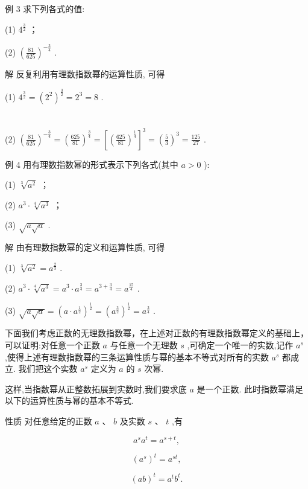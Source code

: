 \documentclass[10pt]{article}
\begin{document}
例 3 求下列各式的值:

(1) \({4}^{\frac{3}{2}}\) ；

(2) \({\left( \frac{81}{625}\right) }^{-\frac{3}{4}}\) .

解 反复利用有理数指数幂的运算性质, 可得

(1) \({4}^{\frac{3}{2}} = {\left( {2}^{2}\right) }^{\frac{3}{2}} = {2}^{3} = 8\) .

\section*{}



(2) \({\left( \frac{81}{625}\right) }^{-\frac{3}{4}} = {\left( \frac{625}{81}\right) }^{\frac{3}{4}} = {\left\lbrack  {\left( \frac{625}{81}\right) }^{\frac{1}{4}}\right\rbrack  }^{3} = {\left( \frac{5}{3}\right) }^{3} = \frac{125}{27}\) .

例 4 用有理数指数幂的形式表示下列各式(其中 \(a > 0\) ):

(1) \(\sqrt[3]{{a}^{2}}\) ；

(2) \({a}^{3} \cdot  \sqrt[4]{{a}^{3}}\) ；

(3) \(\sqrt{a\sqrt{a}}\) .

解 由有理数指数幂的定义和运算性质, 可得

(1) \(\sqrt[3]{{a}^{2}} = {a}^{\frac{2}{3}}\) .

(2) \({a}^{3} \cdot  \sqrt[4]{{a}^{3}} = {a}^{3} \cdot  {a}^{\frac{3}{4}} = {a}^{3 + \frac{3}{4}} = {a}^{\frac{15}{4}}\) .

(3) \(\sqrt{a\sqrt{a}} = {\left( a \cdot  {a}^{\frac{1}{2}}\right) }^{\frac{1}{2}} = {\left( {a}^{\frac{3}{2}}\right) }^{\frac{1}{2}} = {a}^{\frac{3}{4}}\) .

下面我们考虑正数的无理数指数幂，在上述对正数的有理数指数幂定义的基础上，可以证明:对任意一个正数 \(a\) 与任意一个无理数 \(s\) ,可确定一个唯一的实数,记作 \({a}^{s}\) ,使得上述有理数指数幂的三条运算性质与幂的基本不等式对所有的实数 \({a}^{s}\) 都成立. 我们把这个实数 \({a}^{s}\) 定义为 \(a\) 的 \(s\) 次幂.

这样,当指数幂从正整数拓展到实数时,我们要求底 \(a\) 是一个正数. 此时指数幂满足以下的运算性质与幂的基本不等式.

性质 对任意给定的正数 \(a\text{ 、 }b\) 及实数 \(s\text{ 、 }t\) ,有

\[
{a}^{s}{a}^{t} = {a}^{s + t},
\]

\[
{\left( {a}^{s}\right) }^{t} = {a}^{st},
\]

\[
{\left( ab\right) }^{t} = {a}^{t}{b}^{t}.
\]
\end{document}
